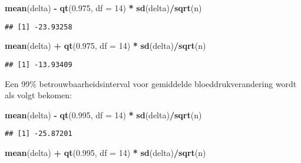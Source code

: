 \documentclass[
  12pt,dutch,coursenotes]{book}
\newenvironment{Shaded}{\begin{snugshade}}{\end{snugshade}}
\newcommand{\DataTypeTok}[1]{\textcolor[rgb]{0.13,0.29,0.53}{#1}}
\newcommand{\DecValTok}[1]{\textcolor[rgb]{0.00,0.00,0.81}{#1}}
\newcommand{\FloatTok}[1]{\textcolor[rgb]{0.00,0.00,0.81}{#1}}
\newcommand{\KeywordTok}[1]{\textcolor[rgb]{0.13,0.29,0.53}{\textbf{#1}}}
\newcommand{\NormalTok}[1]{#1}
\newcommand{\OperatorTok}[1]{\textcolor[rgb]{0.81,0.36,0.00}{\textbf{#1}}}
\newcommand{\StringTok}[1]{\textcolor[rgb]{0.31,0.60,0.02}{#1}}
\theoremstyle{definition}
\theoremstyle{definition}
\theoremstyle{definition}
\theoremstyle{remark}
\begin{document}
\begin{Shaded}
\begin{Highlighting}[]
\KeywordTok{mean}\NormalTok{(delta) }\OperatorTok{{-}}\StringTok{ }\KeywordTok{qt}\NormalTok{(}\FloatTok{0.975}\NormalTok{, }\DataTypeTok{df =} \DecValTok{14}\NormalTok{) }\OperatorTok{*}\StringTok{ }\KeywordTok{sd}\NormalTok{(delta)}\OperatorTok{/}\KeywordTok{sqrt}\NormalTok{(n)}
\end{Highlighting}
\end{Shaded}

\begin{verbatim}
## [1] -23.93258
\end{verbatim}

\begin{Shaded}
\begin{Highlighting}[]
\KeywordTok{mean}\NormalTok{(delta) }\OperatorTok{+}\StringTok{ }\KeywordTok{qt}\NormalTok{(}\FloatTok{0.975}\NormalTok{, }\DataTypeTok{df =} \DecValTok{14}\NormalTok{) }\OperatorTok{*}\StringTok{ }\KeywordTok{sd}\NormalTok{(delta)}\OperatorTok{/}\KeywordTok{sqrt}\NormalTok{(n)}
\end{Highlighting}
\end{Shaded}

\begin{verbatim}
## [1] -13.93409
\end{verbatim}

Een 99\% betrouwbaarheidsinterval voor gemiddelde bloeddrukverandering wordt als volgt bekomen:

\begin{Shaded}
\begin{Highlighting}[]
\KeywordTok{mean}\NormalTok{(delta) }\OperatorTok{{-}}\StringTok{ }\KeywordTok{qt}\NormalTok{(}\FloatTok{0.995}\NormalTok{, }\DataTypeTok{df =} \DecValTok{14}\NormalTok{) }\OperatorTok{*}\StringTok{ }\KeywordTok{sd}\NormalTok{(delta)}\OperatorTok{/}\KeywordTok{sqrt}\NormalTok{(n)}
\end{Highlighting}
\end{Shaded}

\begin{verbatim}
## [1] -25.87201
\end{verbatim}

\begin{Shaded}
\begin{Highlighting}[]
\KeywordTok{mean}\NormalTok{(delta) }\OperatorTok{+}\StringTok{ }\KeywordTok{qt}\NormalTok{(}\FloatTok{0.995}\NormalTok{, }\DataTypeTok{df =} \DecValTok{14}\NormalTok{) }\OperatorTok{*}\StringTok{ }\KeywordTok{sd}\NormalTok{(delta)}\OperatorTok{/}\KeywordTok{sqrt}\NormalTok{(n)}
\end{Highlighting}
\end{Shaded}
\end{document}
